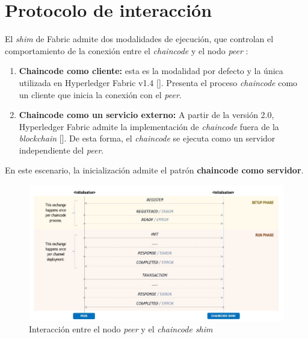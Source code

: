 \section{Protocolo de interacción}\label{protocolinteraction}
El \textit{shim} de Fabric admite dos modalidades de ejecución, que controlan el comportamiento de la conexión entre el \textit{chaincode} y el nodo \textit{peer} :

\begin{enumerate}
\item \textbf{Chaincode como cliente:} esta es la modalidad por defecto y la única utilizada en Hyperledger Fabric v1.4 [\cite{hlf-internals}]. Presenta el proceso \textit{chaincode} como un cliente que inicia la conexión con el \textit{peer}.

\item \textbf{Chaincode como un servicio externo:} A partir de la versión 2.0, Hyperledger Fabric admite la implementación de \textit{chaincode} fuera de la \textit{blockchain} [\cite{hlf-internals}]. De esta forma, el \textit{chaincode} se ejecuta como un servidor independiente del \textit{peer}.
\end{enumerate}

En este escenario, la inicialización admite el patrón \textbf{chaincode como  servidor}.




\begin{figure}[tbph]
\centering
\includegraphics[width=\textwidth]{Images/interaction_protocol}
\caption{Interacción entre el nodo \textit{peer} y el \textit{chaincode shim}}
\label{fig:interactionprotocol}
\end{figure}

